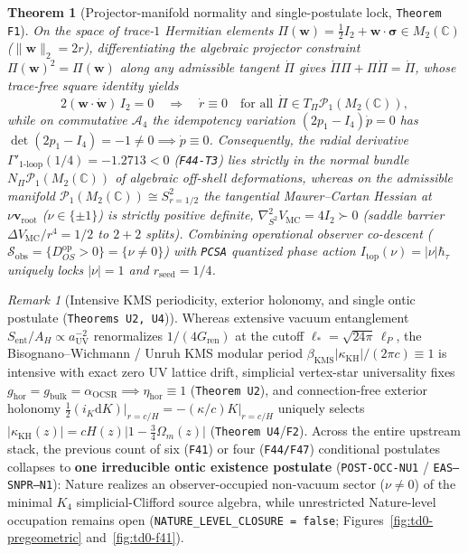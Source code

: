 \documentclass[11pt,a4paper]{article}
\newtheorem{theorem}[definition]{Theorem}
\theoremstyle{remark}
\newtheorem{remark}[definition]{Remark}
\begin{document}
\begin{theorem}[Projector-manifold normality and single-postulate lock, \texttt{Theorem F1}]
\label{thm:frontier-f1}
On the space of trace-$1$ Hermitian elements
$\Pi(\mathbf{w})=\frac{1}{2}I_2+\mathbf{w}\cdot\boldsymbol{\sigma}\in M_2(\mathbb{C})$
($\|\mathbf{w}\|_2=2r$), differentiating the algebraic projector constraint
$\Pi(\mathbf{w})^2=\Pi(\mathbf{w})$ along any admissible tangent $\dot{\Pi}$
gives $\dot{\Pi}\Pi+\Pi\dot{\Pi}=\dot{\Pi}$, whose trace-free square identity yields
\begin{equation}
 2(\mathbf{w}\cdot\dot{\mathbf{w}})\,I_2=0
 \quad\Longrightarrow\quad
 \dot{r}\equiv 0
 \quad\text{for all }\dot{\Pi}\in T_\Pi\mathcal{P}_1(M_2(\mathbb{C})),
 \label{eq:td0-f1-normal}
\end{equation}
while on commutative $\mathcal{A}_4$ the idempotency variation
$(2p_1-I_4)\dot{p}=0$ has $\det(2p_1-I_4)=-1\neq 0\implies\dot{p}\equiv 0$.
Consequently, the radial derivative $\Gamma'_{1\text{-loop}}(1/4)=-1.2713<0$
(\texttt{F44-T3}) lies strictly in the normal bundle
$N_\Pi\mathcal{P}_1(M_2(\mathbb{C}))$ of algebraic off-shell deformations,
whereas on the admissible manifold
$\mathcal{P}_1(M_2(\mathbb{C}))\cong S^2_{r=1/2}$ the tangential Maurer--Cartan
Hessian at $\nu\mathbf{v}_{\mathrm{root}}$ ($\nu\in\{\pm 1\}$) is strictly
positive definite, $\nabla^2_{S^2}V_{\mathrm{MC}}=4I_2\succ 0$ (saddle barrier
$\Delta V_{\mathrm{MC}}/r^4=1/2$ to $2+2$ splits). Combining operational
observer co-descent ($\mathcal{S}_{\mathrm{obs}}=\{D_{OS}^{\mathrm{op}}>0\}=\{\nu\neq 0\}$)
with \texttt{PCSA} quantized phase action $I_{\mathrm{top}}(\nu)=|\nu|\hbar_\tau$
uniquely locks $|\nu|=1$ and $r_{\mathrm{seed}}=1/4$.
\end{theorem}

\begin{remark}[Intensive KMS periodicity, exterior holonomy, and single ontic postulate (\texttt{Theorems U2, U4})]
Whereas extensive vacuum entanglement $S_{\mathrm{ent}}/A_H\propto a_{\mathrm{UV}}^{-2}$
renormalizes $1/(4G_{\mathrm{ren}})$ at the cutoff $\ell_*=\sqrt{24\pi}\,\ell_P$,
the Bisognano--Wichmann / Unruh KMS modular period
$\beta_{\mathrm{KMS}}|\kappa_{\mathrm{KH}}|/(2\pi c)\equiv 1$ is intensive with
exact zero UV lattice drift, simplicial vertex-star universality fixes
$g_{\mathrm{hor}}=g_{\mathrm{bulk}}=\alpha_{\mathrm{OCSR}}\implies\eta_{\mathrm{hor}}\equiv 1$
(\texttt{Theorem U2}), and connection-free exterior holonomy
$\frac{1}{2}(i_K\mathrm{d}K)\vert_{r=c/H}=-(\kappa/c)K\vert_{r=c/H}$ uniquely
selects $|\kappa_{\mathrm{KH}}(z)|=cH(z)\lvert 1-\frac{3}{4}\Omega_m(z)\rvert$
(\texttt{Theorem U4}/\texttt{F2}). Across the entire upstream stack, the
previous count of six (\texttt{F41}) or four (\texttt{F44/F47}) conditional
postulates collapses to \textbf{one irreducible ontic existence postulate}
(\texttt{POST-OCC-NU1} / \texttt{EAS--SNPR--N1}): Nature realizes an
observer-occupied non-vacuum sector ($\nu\neq 0$) of the minimal $K_4$
simplicial-Clifford source algebra, while unrestricted Nature-level occupation
remains open (\texttt{NATURE\_LEVEL\_CLOSURE = false};
Figures~\ref{fig:td0-pregeometric} and~\ref{fig:td0-f41}).
\end{remark}
\end{document}
